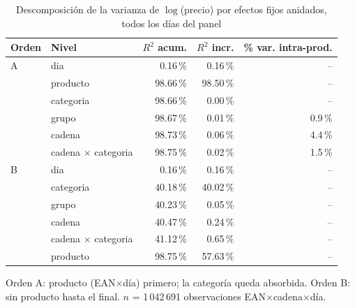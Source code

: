 \begin{table}[htbp]
\caption{Descomposici\'on de la varianza de $\log$(precio) por efectos fijos anidados, todos los d\'ias del panel}
\label{tab:varianza}
\centering\scriptsize\setlength{\tabcolsep}{3pt}
\begin{tabular}{@{}llrrr@{}}
\toprule
Orden & Nivel & $R^2$ acum. & $R^2$ incr. & \% var. intra-prod. \\
\midrule
A & dia & 0.16\,\% & 0.16\,\% & -- \\
 & producto & 98.66\,\% & 98.50\,\% & -- \\
 & categoria & 98.66\,\% & 0.00\,\% & -- \\
 & grupo & 98.67\,\% & 0.01\,\% & 0.9\,\% \\
 & cadena & 98.73\,\% & 0.06\,\% & 4.4\,\% \\
 & cadena $\times$ categoria & 98.75\,\% & 0.02\,\% & 1.5\,\% \\
\midrule
B & dia & 0.16\,\% & 0.16\,\% & -- \\
 & categoria & 40.18\,\% & 40.02\,\% & -- \\
 & grupo & 40.23\,\% & 0.05\,\% & -- \\
 & cadena & 40.47\,\% & 0.24\,\% & -- \\
 & cadena $\times$ categoria & 41.12\,\% & 0.65\,\% & -- \\
 & producto & 98.75\,\% & 57.63\,\% & -- \\
\bottomrule\end{tabular}
\par\smallskip\raggedright\scriptsize Orden A: producto (EAN$\times$d\'ia) primero; la categor\'ia queda absorbida. Orden B: sin producto hasta el final. $n$ = 1\,042\,691 observaciones EAN$\times$cadena$\times$d\'ia.
\end{table}
